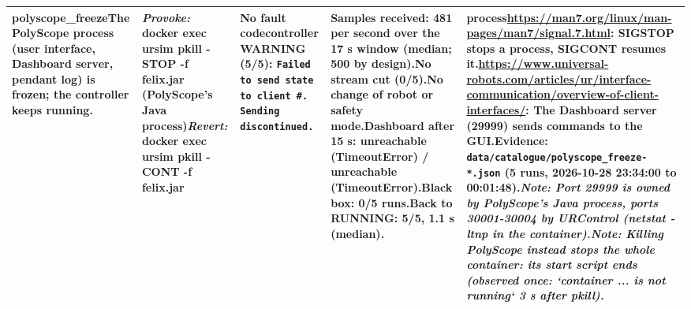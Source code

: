 \documentclass[10pt]{article}
\begin{document}
\begin{longtable}{@{}>{\raggedright\arraybackslash}p{2.7cm}>{\raggedright\arraybackslash}p{4.0cm}>{\raggedright\arraybackslash}p{7.6cm}>{\raggedright\arraybackslash}p{5.2cm}>{\raggedright\arraybackslash}p{6.0cm}@{}}
\textbf{polyscope\_\allowbreak{}freeze}\newline The PolyScope process (user interface,\allowbreak{} Dashboard server,\allowbreak{} pendant log) is frozen; the controller keeps running. & \textit{Provoke:} docker exec ursim pkill -STOP -f felix.jar  (PolyScope's Java process)\newline\textit{Revert:} docker exec ursim pkill -CONT -f felix.jar & \textbf{No fault code}\newline \textsf{controller} WARNING (5/5): \texttt{Failed to send state to client \#. Sending discontinued.} & Samples received: 481 per second over the 17 s window (median; 500 by design).\newline No stream cut (0/5).\newline No change of robot or safety mode.\newline Dashboard after 15 s: unreachable (TimeoutError) / unreachable (TimeoutError).\newline Black box: 0/5 runs.\newline Back to RUNNING: 5/5, 1.1 s (median). & \textbf{process}\newline \url{https://man7.org/linux/man-pages/man7/signal.7.html}: SIGSTOP stops a process,\allowbreak{} SIGCONT resumes it.\newline \url{https://www.universal-robots.com/articles/ur/interface-communication/overview-of-client-interfaces/}: The Dashboard server (29999) sends commands to the GUI.\newline Evidence: \texttt{data/catalogue/polyscope\_\allowbreak{}freeze-*.json} (5 runs, 2026-10-28 23:34:00 to 00:01:48).\newline \textit{Note: Port 29999 is owned by PolyScope's Java process,\allowbreak{} ports 30001-30004 by URControl (netstat -ltnp in the container).}\newline \textit{Note: Killing PolyScope instead stops the whole container: its start script ends (observed once: `container ... is not running` 3 s after pkill).} \\ \midrule

\end{longtable}
\end{document}

